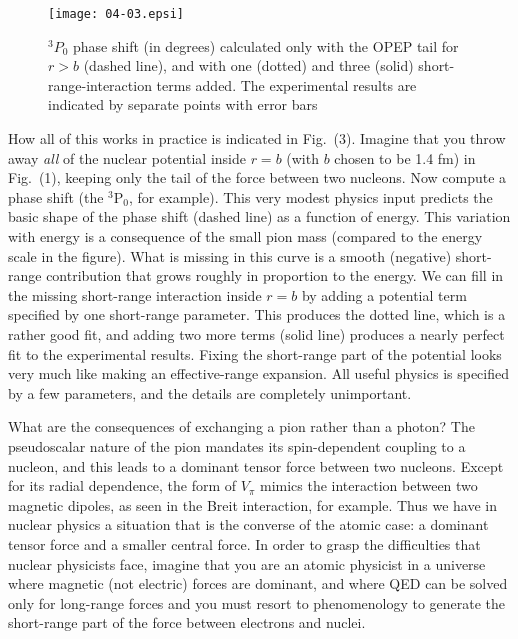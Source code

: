 \documentclass{svmult}
\begin{document}
\begin{figure} \centering 
\texttt{[image: 04-03.epsi]}  
\caption{$^3P_0$ phase shift (in degrees) calculated only with the OPEP tail for
$r > b$ (dashed line), and with one (dotted) and three (solid)
short-range-interaction terms added. The experimental results are indicated by
separate points with error bars\protect\cite{psa}}
\end{figure}

How all of this works in practice is indicated in Fig.~(3). Imagine that you
throw away {\it all} of the nuclear potential inside $r = b$ (with $b$ chosen to
be 1.4 fm) in Fig.~(1), keeping only the tail of the force between two nucleons.
Now compute a phase shift (the $^3$P$_0$, for example). This very modest physics
input predicts the basic shape of the phase shift (dashed line) as a function of
energy. This variation with energy is a consequence of the small pion mass
(compared to the energy scale in the figure). What is missing in this curve is a
smooth (negative) short-range contribution that grows roughly in proportion to
the energy. We can fill in the missing short-range interaction inside $r = b$ by
adding a potential term specified by one short-range parameter. This produces
the dotted line, which is a rather good fit, and adding two more terms (solid
line) produces a nearly perfect fit to the experimental results. Fixing the
short-range part of the potential looks very
much like making an effective-range expansion. All useful physics is specified
by a few parameters, and the details are completely unimportant.

What are the consequences of exchanging a pion rather than a photon?  The
pseudoscalar nature of the pion mandates its spin-dependent coupling to a 
nucleon, and this leads to a dominant tensor force
between two nucleons.  Except for its radial dependence, the form of $V_{\pi}$
mimics the interaction between two magnetic dipoles, as seen in the Breit
interaction, for example. Thus we have in nuclear physics a situation that is
the converse of the atomic case:  a dominant tensor force and a smaller central
force.  In order to grasp the difficulties that nuclear physicists face, imagine
that you are an atomic physicist in a universe where magnetic (not electric)
forces are dominant, and where QED can be solved only for long-range forces and
you must resort to phenomenology to generate the short-range part of the force
between electrons and nuclei.
\end{document}
